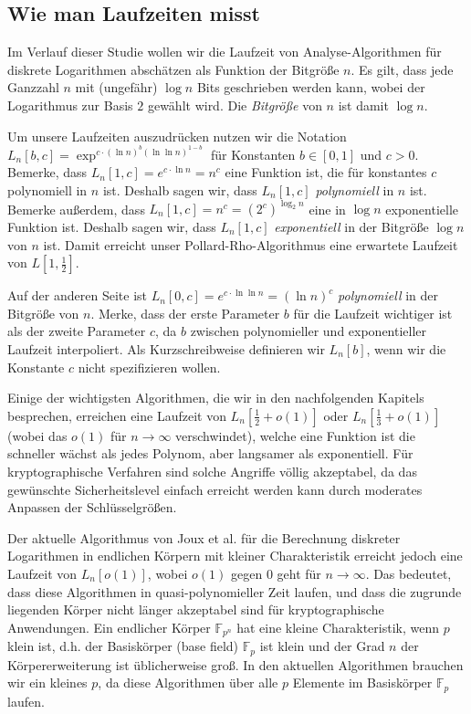 \begin{refsegment}
\subsection{Wie man Laufzeiten misst}
Im Verlauf dieser Studie wollen wir die Laufzeit von Analyse-Algorithmen für diskrete Logarithmen abschätzen als Funktion der Bitgröße $n$. Es gilt, dass jede Ganzzahl $n$ mit (ungefähr) $\log n$ Bits geschrieben werden kann, wobei der Logarithmus zur Basis $2$ gewählt wird. Die {\em Bitgröße} von $n$ ist damit $\log n$.

Um unsere Laufzeiten auszudrücken nutzen wir die Notation $L_n[b,c]=\exp^{c \cdot (\ln n)^{b}(\ln\ln n)^{1-b}}$ für Konstanten $b \in [0,1]$ und $c>0$. Bemerke, dass $L_n[1,c]=e^{c \cdot \ln n} = n^c$ eine Funktion ist, die für konstantes $c$ polynomiell in $n$ ist. Deshalb sagen wir, dass $L_n[1,c]$ {\em polynomiell} in $n$ ist. Bemerke außerdem, dass $L_n[1,c]=n^c = (2^{c})^{\log_2 n}$ eine in $\log n$ exponentielle Funktion ist. Deshalb sagen wir, dass $L_n[1,c]$ {\em exponentiell} in der Bitgröße $\log n$ von $n$ ist. Damit erreicht unser Pollard-Rho-Algorithmus eine erwartete Laufzeit von $L[1,\frac 1 2]$.

Auf der anderen Seite ist $L_n[0,c] = e^{c \cdot \ln\ln n} = (\ln n)^c$ {\em polynomiell} in der Bitgröße von $n$. Merke, dass der erste Parameter $b$ für die Laufzeit wichtiger ist als der zweite Parameter $c$, da $b$ zwischen polynomieller und exponentieller Laufzeit interpoliert. Als Kurzschreibweise definieren wir $L_n[b]$, wenn wir die Konstante $c$ nicht spezifizieren wollen.

Einige der wichtigsten Algorithmen, die wir in den nachfolgenden Kapitels besprechen, erreichen eine Laufzeit von $L_n[\frac 1 2 +o(1)]$ oder $L_n[\frac 1 3 +o(1)]$ (wobei das $o(1)$ für $n\to\infty$ verschwindet), welche eine Funktion ist die schneller wächst als jedes Polynom, aber langsamer als exponentiell. Für kryptographische Verfahren sind solche Angriffe völlig akzeptabel, da das gewünschte Sicherheitslevel einfach erreicht werden kann durch moderates Anpassen der Schlüsselgrößen.

Der aktuelle Algorithmus von Joux et al. für die Berechnung diskreter Logarithmen in endlichen Körpern mit kleiner Charakteristik erreicht jedoch eine Laufzeit von $L_n[o(1)]$, wobei $o(1)$ gegen $0$ geht für $n \to \infty$. Das bedeutet, dass diese Algorithmen in quasi-polynomieller Zeit laufen, und dass die zugrunde liegenden Körper nicht länger akzeptabel sind für kryptographische Anwendungen. Ein endlicher Körper $\mathbb{F}_{p^n}$ hat eine kleine Charakteristik, wenn $p$ klein ist, d.h. der Basiskörper (base field) $\mathbb{F}_p$ ist klein und der Grad $n$ der Körpererweiterung ist üblicherweise groß. In den aktuellen Algorithmen brauchen wir ein kleines $p$, da diese Algorithmen über alle $p$ Elemente im Basiskörper $\mathbb{F}_p$ laufen.



\end{refsegment}

